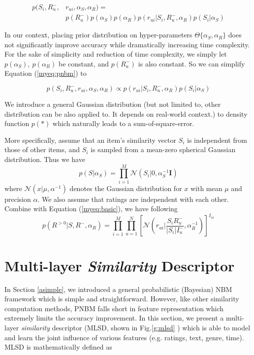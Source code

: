 \documentclass[conference]{IEEEtran}
\begin{document}
\begin{equation}\label{myeq:pnbm}
\begin{split}
p(S_i, R_u^{-}, & r_{ui}, \alpha_S, \alpha_R) = \\ & p(R_u^{-})p(\alpha_S)p(\alpha_R)p(r_{ui}|S_i,R_u^{-},\alpha_R)p(S_i|\alpha_S)
\end{split}
\end{equation}

In our context, placing prior distribution on hyper-parameters $\Theta \{ \alpha_S, \alpha_R \}$ does not significantly improve accuracy while dramatically increasing time complexity. For the sake of simplicity and reduction of time complexity, we simply  let $p(\alpha_S), \ p(\alpha_R)$ be constant, and $p(R_u^{-})$ is also constant. So we can simplify Equation (\ref{myeq:pnbm}) to

\begin{equation}\label{myeq:pnbm2}
p(S_i, R_u^{-},  r_{ui}, \alpha_S, \alpha_R) \propto  p(r_{ui}|S_i,R_u^{-},\alpha_R)p(S_i|\alpha_S)
\end{equation}


We introduce a general Gaussian distribution (but not limited to, other distribution can be also applied to. It depends on real-world context.) to density function $p(*)$ which naturally leads to a sum-of-square-error.

More specifically, assume that an item's similarity vector $S_i$ is independent from those of other items, and $S_i$ is sampled from a mean-zero spherical Gaussian distribution. Thus we have
\begin{equation}\label{myeq:gsim}
p(S|\alpha_{S})=\prod_{i=1}^{M} \mathcal{N}(S_{i}|0, \alpha_{S}^{-1}\mathbf{I})
\end{equation}
where $\mathcal{N}(x|\mu,\alpha^{-1})$ denotes the Gaussian distribution for $x$ with mean $\mu$ and precision $\alpha$.
We also assume that ratings are independent with each other. Combine with Equation (\ref{myeq:basic}), we have following
 \begin{equation}\label{myeq:grate}
p(R^{>0}|S,R^-,\alpha_{R}) = \prod_{i=1}^{M}\prod_{u=1}^{N}[\mathcal{N}(r_{ui}|\frac{S_{i}R_{u}^-}{|S_{i}|I_{u}^-}, \alpha_{R}^{-1}) ]^{I_{ui}}
\end{equation}

\section{Multi-layer \emph{Similarity} Descriptor}
\label{cpnbm}
In Section \ref{asimple}, we introduced a general probabilistic (Bayesian) NBM framework which is simple and straightforward. However, like other similarity computation methods, PNBM falls short in  feature representation which extremely limits the accuracy improvement.  In this section, we present a multi-layer \emph{similarity} descriptor (MLSD, shown in Fig.\ref{g:mlsd} ) which is able to model and learn the joint influence of various features (e.g. ratings, text, genre, time). MLSD is mathematically defined as
\end{document}

